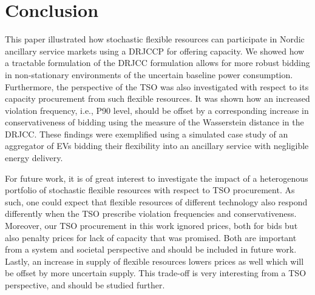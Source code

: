 \documentclass[conference]{IEEEtran}
\begin{document}
\vspace{2mm}
\section{Conclusion}
\vspace{-1mm}
This paper illustrated how stochastic flexible resources can participate in Nordic ancillary service markets using a \ac{DRJCCP} for offering capacity. We showed how a tractable formulation of the \ac{DRJCC} formulation allows for more robust bidding in non-stationary environments of the uncertain baseline power consumption. Furthermore, the perspective of the \ac{TSO} was also investigated with respect to its capacity procurement from such flexible resources. It was shown how an increased violation frequency, i.e., P90 level, should be offset by a corresponding increase in conservativeness of bidding using the measure of the Wasserstein distance in the \ac{DRJCC}. These findings were exemplified using a simulated case study of an aggregator of \acp{EV} bidding their flexibility into an ancillary service with negligible energy delivery.

For future work, it is of great interest to investigate the impact of a heterogenous portfolio of stochastic flexible resources with respect to \ac{TSO} procurement. As such, one could expect that flexible resources of different technology also respond differently when the \ac{TSO} prescribe violation frequencies and conservativeness. Moreover, our \ac{TSO} procurement in this work ignored prices, both for bids but also penalty prices for lack of capacity that was promised. Both are important from a system and societal perspective and should be included in future work. Lastly, an increase in supply of flexible resources lowers prices as well which will be offset by more uncertain supply. This trade-off is very interesting from a \ac{TSO} perspective, and should be studied further.







%


\vfill
\end{document}
